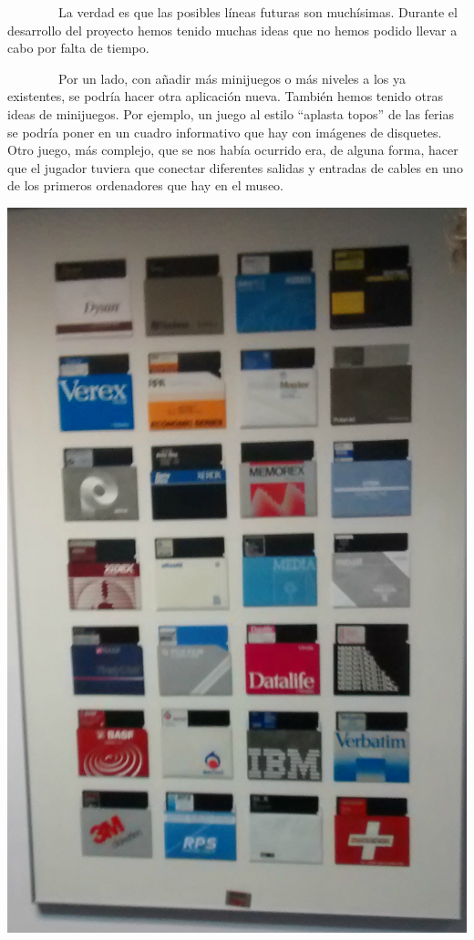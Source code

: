 \documentclass[]{article}
\begin{document}

~~~~~~~~La verdad es que las posibles líneas futuras son muchísimas.
Durante el desarrollo del proyecto hemos tenido muchas ideas que no
hemos podido llevar a cabo por falta de tiempo.

~~~~~~~~Por un lado, con añadir más minijuegos o más niveles a los ya
existentes, se podría hacer otra aplicación nueva. También hemos tenido
otras ideas de minijuegos. Por ejemplo, un juego al estilo ``aplasta
topos'' de las ferias se podría poner en un cuadro informativo que hay
con imágenes de disquetes. Otro juego, más complejo, que se nos había
ocurrido era, de alguna forma, hacer que el jugador tuviera que conectar
diferentes salidas y entradas de cables en uno de los primeros
ordenadores que hay en el museo.

\includegraphics{images/image09.png}
\end{document}
